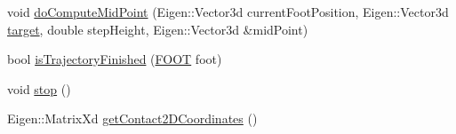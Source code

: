\begin{DoxyCompactItemize}
\item 
void \hyperlink{classStepController_a16b1f62737f1287b7f33b216871d1ba8}{do\-Compute\-Mid\-Point} (\-Eigen\-::\-Vector3d current\-Foot\-Position, \-Eigen\-::\-Vector3d \hyperlink{classStepController_a588d5b149eb4a6877e89ecff37d0f91d}{target}, double step\-Height, \-Eigen\-::\-Vector3d \&mid\-Point)
\item 
bool \hyperlink{classStepController_a9e2415755548f47301277feb7a376270}{is\-Trajectory\-Finished} (\hyperlink{utils_8h_a4b6a8e135f90bd56e5a57a60efb42529}{\-F\-O\-O\-T} foot)
\item 
void \hyperlink{classStepController_a48224628b92c088a34d9db4a14f75f1a}{stop} ()
\item 
\-Eigen\-::\-Matrix\-Xd \hyperlink{classStepController_afb77002292921660ef4a44657d6566f1}{get\-Contact2\-D\-Coordinates} ()
\end{DoxyCompactItemize}
